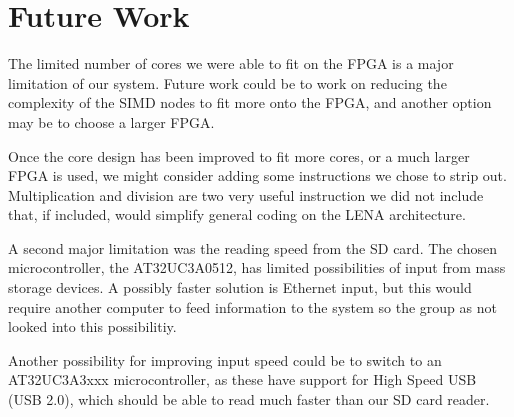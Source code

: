 \section{Future Work}
The limited number of cores we were able to fit on the FPGA is a major limitation
of our system. Future work could be to work on reducing the complexity of the
SIMD nodes to fit more onto the FPGA, and another option may be to choose a larger
FPGA.

Once the core design has been improved to fit more cores, or a much larger FPGA is
used, we might consider adding some instructions we chose to strip out. Multiplication
and division are two very useful instruction we did not include that, if included, would simplify
general coding on the LENA architecture.

A second major limitation was the reading speed from the SD card.
The chosen microcontroller, the AT32UC3A0512, has limited possibilities of input
from mass storage devices. A possibly faster solution is Ethernet input, but this
would require another computer to feed information to the system so the group
as not looked into this possibilitiy.

Another possibility for improving input speed could be to switch to an AT32UC3A3xxx
microcontroller, as these have support for High Speed USB (USB 2.0), which should be
able to read much faster than our SD card reader.
